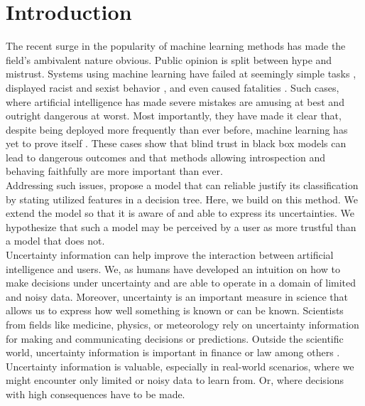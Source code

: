 \documentclass[a4paper,cleardoubleempty,BCOR1cm, 11pt]{report}
\begin{document}
\tableofcontents



\chapter{Introduction}
The recent surge in the popularity of machine learning methods has made the field's ambivalent nature obvious. Public opinion is split between hype and mistrust. 
Systems using machine learning have failed at seemingly simple tasks \cite{kelion2018ces}, displayed racist and sexist behavior \cite{guynn2015google, schlesinger2018let, zou2018ai}, and even caused fatalities \cite{yadron2016tesla}.
Such cases, where artificial intelligence has made severe mistakes are amusing at best and outright dangerous at worst. Most importantly, they have made it clear that, despite being deployed more frequently than ever before, machine learning has yet to prove itself \cite{schlesinger2018let, dikmen2016autonomous, zou2018ai}. 
These cases show that blind trust in black box models can lead to dangerous outcomes and that methods allowing introspection and behaving faithfully are more important than ever.\\
Addressing such issues, \citet{alaniz2019explainable} propose a model that can reliable justify its classification by stating utilized features in a decision tree. Here, we build on this method. We extend the model so that it is aware of and able to express its uncertainties. We hypothesize that such a model may be perceived by a user as more trustful than a model that does not.\\
Uncertainty information can help improve the interaction between artificial intelligence and users.
We, as humans have developed an intuition on how to make decisions under uncertainty \cite{bland2012different} and are able to operate in a domain of limited and noisy data. Moreover, uncertainty is an important measure in science that allows us to express how well something is known or can be known. Scientists from fields like medicine, physics, or meteorology rely on uncertainty information for making and communicating decisions or predictions. Outside the scientific world, uncertainty information is important in finance or law among others \cite{liu2013toward, d1983legal}.\\
Uncertainty information is valuable, especially in real-world scenarios, where we might encounter only limited or noisy data to learn from. Or, where decisions with high consequences have to be made. 
\end{document}
